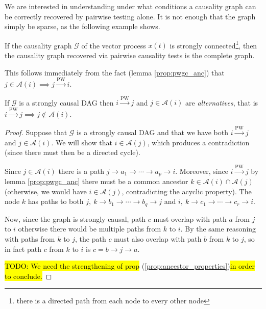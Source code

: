 \documentclass[12pt]{article}
\def\pwgc{\overset{\text{PW}}{\rightarrow}}  %
\def\gcg{\mathcal{G}}  %
\newcommand{\anc}[1]{\mathcal{A}(#1)}  %
\newcommand{\gcgpath}[4]{#1 \rightarrow #2_1 \rightarrow \cdots \rightarrow #2_{#3} \rightarrow #4}
\begin{document}

We are interested in understanding under what conditions a causality
graph can be correctly recovered by pairwise testing alone.  It is not
enough that the graph simply be sparse, as the following example shows.

\begin{example}
  If the causality graph $\gcg$ of the vector process $x(t)$ is
  strongly connected\footnote{there is a directed path from each node
    to every other node}, then the causality graph recovered via
  pairwise causality tests is the complete graph.
 
  This follows immediately from the fact (lemma \ref{prop:pwgc_anc})
  that $j \in \anc{i} \implies j \pwgc i$.
\end{example}



\begin{lemma}
  If $\gcg$ is a strongly causal DAG then $i \pwgc j$ and $j \in \anc{i}$ are
  \textit{alternatives}, that is $i \pwgc j \implies j \notin \anc{i}$.
\end{lemma}
\begin{proof}
  Suppose that $\gcg$ is a strongly causal DAG and that we have both
  $i \pwgc j$ and $j \in \anc{i}$.  We will show that $i \in \anc{j}$,
  which produces a contradiction (since there must then be a directed cycle).

  Since $j \in \anc{i}$ there is a path $\gcgpath{j}{a}{p}{i}$.
  Moreover, since $i \pwgc j$ by lemma \ref{prop:pwgc_anc} there must
  be a common ancestor $k \in \anc{i} \cap \anc{j}$ (otherwise, we would
  have $i \in \anc{j}$, contradicting the acyclic property).  The node
  $k$ has paths to both $j,\ \gcgpath{k}{b}{q}{j}$ and $i,\ \gcgpath{k}{c}{r}{i}$.

  Now, since the graph is strongly causal, path $c$ must overlap with
  path $a$ from $j$ to $i$ otherwise there would be multiple paths
  from $k$ to $i$.  By the same reasoning with paths from $k$ to $j$,
  the path $c$ must also overlap with path $b$ from $k$ to $j$, so in
  fact path $c$ from $k$ to $i$ is
  $c = b \rightarrow j \rightarrow a$.

  \hl{TODO: We need the strengthening of prop }(\ref{prop:ancestor_properties})\hl{in order to conclude.}

\end{proof}
\end{document}
